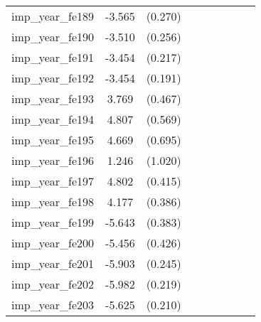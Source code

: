 {\begin{tabular}{l*{4}{cc}}
imp\_year\_fe189&   -3.565\sym{***}&  (0.270)&                  &         &                  &         &                  &         \\
imp\_year\_fe190&   -3.510\sym{***}&  (0.256)&                  &         &                  &         &                  &         \\
imp\_year\_fe191&   -3.454\sym{***}&  (0.217)&                  &         &                  &         &                  &         \\
imp\_year\_fe192&   -3.454\sym{***}&  (0.191)&                  &         &                  &         &                  &         \\
imp\_year\_fe193&    3.769\sym{***}&  (0.467)&                  &         &                  &         &                  &         \\
imp\_year\_fe194&    4.807\sym{***}&  (0.569)&                  &         &                  &         &                  &         \\
imp\_year\_fe195&    4.669\sym{***}&  (0.695)&                  &         &                  &         &                  &         \\
imp\_year\_fe196&    1.246         &  (1.020)&                  &         &                  &         &                  &         \\
imp\_year\_fe197&    4.802\sym{***}&  (0.415)&                  &         &                  &         &                  &         \\
imp\_year\_fe198&    4.177\sym{***}&  (0.386)&                  &         &                  &         &                  &         \\
imp\_year\_fe199&   -5.643\sym{***}&  (0.383)&                  &         &                  &         &                  &         \\
imp\_year\_fe200&   -5.456\sym{***}&  (0.426)&                  &         &                  &         &                  &         \\
imp\_year\_fe201&   -5.903\sym{***}&  (0.245)&                  &         &                  &         &                  &         \\
imp\_year\_fe202&   -5.982\sym{***}&  (0.219)&                  &         &                  &         &                  &         \\
imp\_year\_fe203&   -5.625\sym{***}&  (0.210)&                  &         &                  &         &                  &         \\

\end{tabular}}
